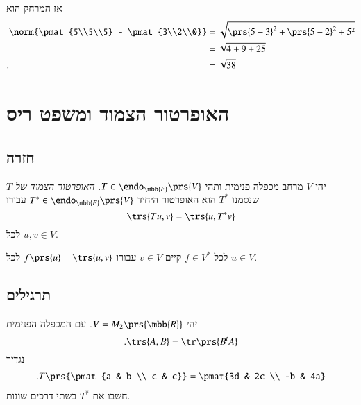\documentclass[a4paper,10pt,oneside,openany]{article}
\begin{document}
\begin{solution}
אז המרחק הוא
\begin{align*}
\norm{\pmat{5\\5\\5} - \pmat{3\\2\\0}} &= \sqrt{\prs{5-3}^2 + \prs{5-2}^2 + 5^2}
\\&= \sqrt{4 + 9 + 25}
\\ \text{.} \hphantom{\norm{\pmat{5\\5\\5} - \pmat{3\\2\\0}}} &= \sqrt{38}
\end{align*}
\end{solution}

\section{האופרטור הצמוד ומשפט ריס}

\subsection{חזרה}

\begin{definition}
יהי
$V$
מרחב מכפלה פנימית ותהי
$T \in \endo_{\mbb{F}}\prs{V}$.
\emph{האופרטור הצמוד של
$T$}
שנסמנו
$T^*$
הוא האופרטור היחיד
$T^* \in \endo_{\mbb{F}}\prs{V}$
עבורו
\[\trs{Tu,v} = \trs{u,T^*v}\]
לכל
$u,v \in V$.
\end{definition}

\begin{theorem}[ריס]
לכל
$f \in V^*$
קיים
$v \in V$
עבורו
$f\prs{u} = \trs{u,v}$
לכל
$u \in V$.
\end{theorem}

\subsection{תרגילים}

\begin{exercise}
יהי
$V = M_2\prs{\mbb{R}}$.
עם המכפלה הפנימית
\[\text{.} \trs{A,B} = \tr\prs{B^t A}\]
נגדיר
\begin{align*}
\text{.} T\prs{\pmat{a & b \\ c & c}} = \pmat{3d & 2c \\ -b & 4a}
\end{align*}
חשבו את
$T^*$
בשתי דרכים שונות.
\end{exercise}
\end{document}
